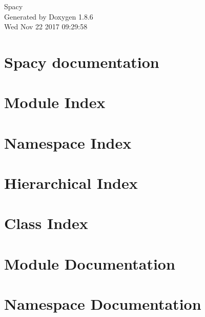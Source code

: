 \documentclass[twoside]{book}
\newcommand{\clearemptydoublepage}{%
  \newpage{\pagestyle{empty}\cleardoublepage}%
}
\begin{document}
\hypersetup{pageanchor=false}
\begin{titlepage}
\vspace*{7cm}
\begin{center}%
{\Large Spacy }\\
\vspace*{1cm}
{\large Generated by Doxygen 1.8.6}\\
\vspace*{0.5cm}
{\small Wed Nov 22 2017 09:29:58}\\
\end{center}
\end{titlepage}
\clearemptydoublepage
\tableofcontents
\clearemptydoublepage
{}
\hypersetup{pageanchor=true}

\chapter{Spacy documentation}
\label{index}\hypertarget{index}{}
\chapter{Module Index}

\chapter{Namespace Index}

\chapter{Hierarchical Index}

\chapter{Class Index}

\chapter{Module Documentation}













\chapter{Namespace Documentation}
















\end{document}
